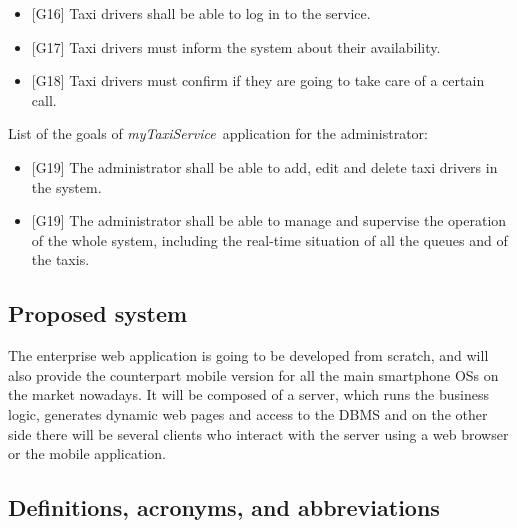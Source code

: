 \documentclass[a4paper,11pt]{report} %
\newcommand{\mts}{\mbox{\normalfont\itshape myTaxiService\ }}
\begin{document}
		\begin{itemize}
			\item {[}G16{]} Taxi drivers shall be able to log in to the service.
			\item {[}G17{]} Taxi drivers must inform the system about their availability.
			\item {[}G18{]} Taxi drivers must confirm if they are going to take care of a certain call.
		\end{itemize}
		List of the goals of \mts application for the administrator:
		\begin{itemize}
			\item {[}G19{]} The administrator shall be able to add, edit and delete taxi drivers in the system.
			\item {[}G19{]} The administrator shall be able to manage and supervise the operation of the whole system, including the real-time situation of all the queues and of the taxis.
		\end{itemize}
		
		
		
	\subsection{Proposed system}
	The enterprise web application is going to be developed from scratch, and will also provide the counterpart mobile version for all the main smartphone OSs on the market nowadays. It will be composed of a server, which runs the business logic, generates dynamic web pages and access to the DBMS and on the other side there will be several clients who interact with the server using a web browser or the mobile application.
	
	\subsection{Definitions, acronyms, and abbreviations}
	
\end{document}
